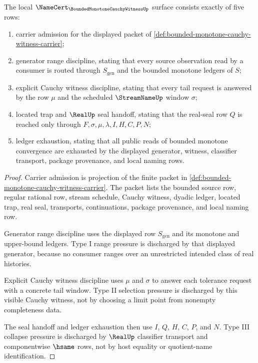 
\begin{theorem}
\label{thm:bounded-monotone-cauchy-witness-namecert-obligations}
The local $\NameCert_{\BoundedMonotoneCauchyWitnessUp}$ surface consists exactly of five rows:
\begin{enumerate}
\item carrier admission for the displayed packet of \autoref{def:bounded-monotone-cauchy-witness-carrier};
\item generator range discipline, stating that every source observation read by a consumer is routed through $S_{\mathrm{gen}}$ and the bounded monotone ledgers of $S$;
\item explicit Cauchy witness discipline, stating that every tail request is answered by the row $\mu$ and the scheduled $\StreamNameUp$ window $\sigma$;
\item located trap and $\RealUp$ seal handoff, stating that the real-seal row $Q$ is reached only through $F,\sigma,\mu,\lambda,I,H,C,P,N$;
\item ledger exhaustion, stating that all public reads of bounded monotone convergence are exhausted by the displayed generator, witness, classifier transport, package provenance, and local naming rows.
\end{enumerate}
\end{theorem}
\begin{proof}
Carrier admission is projection of the finite packet in \autoref{def:bounded-monotone-cauchy-witness-carrier}. The packet lists the bounded source row, regular rational row, stream schedule, Cauchy witness, dyadic ledger, located trap, real seal, transports, continuations, package provenance, and local naming row.

Generator range discipline uses the displayed row $S_{\mathrm{gen}}$ and its monotone and upper-bound ledgers. Type I range pressure is discharged by that displayed generator, because no consumer ranges over an unrestricted intended class of real histories.

Explicit Cauchy witness discipline uses $\mu$ and $\sigma$ to answer each tolerance request with a concrete tail window. Type II selection pressure is discharged by this visible Cauchy witness, not by choosing a limit point from nonempty completeness data.

The seal handoff and ledger exhaustion then use $I$, $Q$, $H$, $C$, $P$, and $N$. Type III collapse pressure is discharged by $\RealUp$ classifier transport and componentwise $\hsame$ rows, not by host equality or quotient-name identification.
\end{proof}

